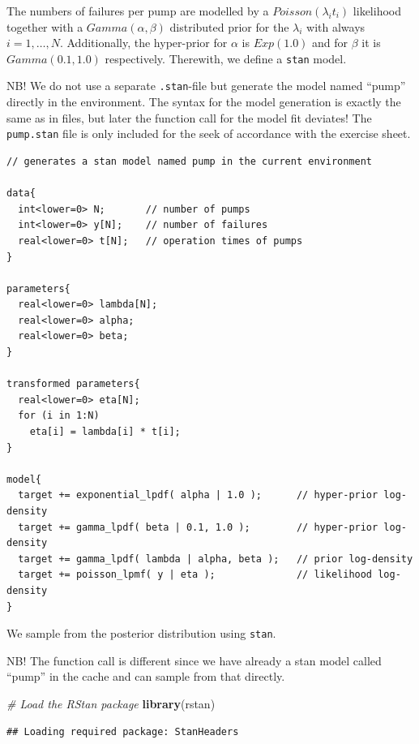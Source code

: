 \documentclass[
]{article}
\newenvironment{Shaded}{\begin{snugshade}}{\end{snugshade}}
\newcommand{\CommentTok}[1]{\textcolor[rgb]{0.56,0.35,0.01}{\textit{#1}}}
\newcommand{\KeywordTok}[1]{\textcolor[rgb]{0.13,0.29,0.53}{\textbf{#1}}}
\newcommand{\NormalTok}[1]{#1}
\begin{document}
The numbers of failures per pump are modelled by a
\(Poisson(\lambda_i t_i)\) likelihood together with a
\(Gamma(\alpha,\beta)\) distributed prior for the \(\lambda_i\) with
always \(i=1,\dots,N\). Additionally, the hyper-prior for \(\alpha\) is
\(Exp(1.0)\) and for \(\beta\) it is \(Gamma(0.1,1.0)\) respectively.
Therewith, we define a \texttt{stan} model.

NB! We do not use a separate \texttt{.stan}-file but generate the model
named ``pump'' directly in the environment. The syntax for the model
generation is exactly the same as in files, but later the function call
for the model fit deviates! The \texttt{pump.stan} file is only included
for the seek of accordance with the exercise sheet.

\begin{verbatim}
// generates a stan model named pump in the current environment

data{
  int<lower=0> N;       // number of pumps
  int<lower=0> y[N];    // number of failures
  real<lower=0> t[N];   // operation times of pumps
}

parameters{
  real<lower=0> lambda[N];
  real<lower=0> alpha;
  real<lower=0> beta;
}

transformed parameters{
  real<lower=0> eta[N];
  for (i in 1:N)
    eta[i] = lambda[i] * t[i];
}

model{
  target += exponential_lpdf( alpha | 1.0 );      // hyper-prior log-density
  target += gamma_lpdf( beta | 0.1, 1.0 );        // hyper-prior log-density
  target += gamma_lpdf( lambda | alpha, beta );   // prior log-density
  target += poisson_lpmf( y | eta );              // likelihood log-density
}
\end{verbatim}

We sample from the posterior distribution using \texttt{stan}.

NB! The function call is different since we have already a stan model
called ``pump'' in the cache and can sample from that directly.

\begin{Shaded}
\begin{Highlighting}[]
\CommentTok{# Load the RStan package}
\KeywordTok{library}\NormalTok{(rstan)}
\end{Highlighting}
\end{Shaded}

\begin{verbatim}
## Loading required package: StanHeaders
\end{verbatim}
\end{document}
